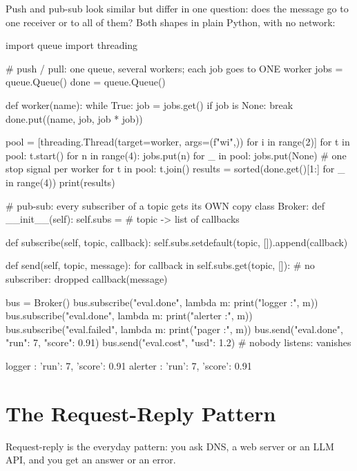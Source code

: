 Push and pub-sub look similar but differ in one question: does the message go to one
receiver or to all of them? Both shapes in plain Python, with no network:

\begin{pycode}
import queue
import threading

# push / pull: one queue, several workers; each job goes to ONE worker
jobs = queue.Queue()
done = queue.Queue()

def worker(name):
    while True:
        job = jobs.get()
        if job is None:
            break
        done.put((name, job, job * job))

pool = [threading.Thread(target=worker, args=(f"w{i}",)) for i in range(2)]
for t in pool:
    t.start()
for n in range(4):
    jobs.put(n)
for _ in pool:
    jobs.put(None)               # one stop signal per worker
for t in pool:
    t.join()
results = sorted(done.get()[1:] for _ in range(4))
print(results)

# pub-sub: every subscriber of a topic gets its OWN copy
class Broker:
    def __init__(self):
        self.subs = {}           # topic -> list of callbacks

    def subscribe(self, topic, callback):
        self.subs.setdefault(topic, []).append(callback)

    def send(self, topic, message):
        for callback in self.subs.get(topic, []):   # no subscriber: dropped
            callback(message)

bus = Broker()
bus.subscribe("eval.done", lambda m: print("logger  :", m))
bus.subscribe("eval.done", lambda m: print("alerter :", m))
bus.subscribe("eval.failed", lambda m: print("pager   :", m))
bus.send("eval.done", {"run": 7, "score": 0.91})
bus.send("eval.cost", {"usd": 1.2})        # nobody listens: vanishes
\end{pycode}
\begin{rawcode}
[(0, 0), (1, 1), (2, 4), (3, 9)]
logger  : {'run': 7, 'score': 0.91}
alerter : {'run': 7, 'score': 0.91}
\end{rawcode}

\section{The Request-Reply Pattern}

Request-reply is the everyday pattern: you ask DNS, a web server or an LLM API, and you
get an answer or an error.

